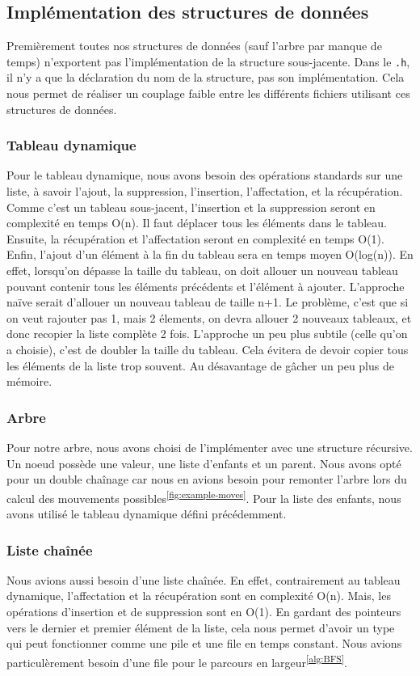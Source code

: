\subsection{Implémentation des structures de données}
Premièrement toutes nos structures de données (sauf l'arbre par manque de temps)
n'exportent pas l'implémentation de la structure sous-jacente. Dans le \verb|.h|, il n'y a que la déclaration
du nom de la structure, pas son implémentation. Cela nous permet de réaliser un couplage faible
entre les différents fichiers utilisant ces structures de données.
\subsubsection{Tableau dynamique}
Pour le tableau dynamique, nous avons besoin des opérations standards 
sur une liste, à savoir l'ajout, la suppression, l'insertion, l'affectation, et la récupération.
Comme c'est un tableau sous-jacent, l'insertion et la suppression seront en complexité en temps O(n).
Il faut déplacer tous les éléments dans le tableau.
Ensuite, la récupération et l'affectation seront en complexité en temps O(1).
Enfin, l'ajout d'un élément à la fin du tableau sera en temps moyen O(log(n)).
En effet, lorsqu'on dépasse la taille du tableau, on doit allouer un nouveau tableau
pouvant contenir tous les éléments précédents et l'élément à ajouter.
L'approche naïve serait d'allouer un nouveau tableau de taille n+1. Le problème,
c'est que si on veut rajouter pas 1, mais 2 élements, on devra allouer 2 nouveaux tableaux, et donc recopier la liste complète 2 fois.
L'approche un peu plus subtile (celle qu'on a choisie), c'est de doubler la taille du tableau.
Cela évitera de devoir copier tous les éléments de la liste trop souvent. Au désavantage de gâcher un peu plus de mémoire.
\subsubsection{Arbre}
Pour notre arbre, nous avons choisi de l'implémenter avec une structure récursive.
Un noeud possède une valeur, une liste d'enfants et un parent.
Nous avons opté pour un double chaînage car nous en avions besoin pour remonter l'arbre
lors du calcul des mouvements possibles\textsuperscript{\ref{fig:example-moves}}.
Pour la liste des enfants, nous avons utilisé le tableau dynamique défini précédemment.
\subsubsection{Liste chaînée}
Nous avions aussi besoin d'une liste chaînée.
En effet, contrairement au tableau dynamique, l'affectation et la récupération sont en complexité O(n).
Mais, les opérations d'insertion et de suppression sont en O(1). En gardant
des pointeurs vers le dernier et premier élément de la liste, cela nous permet d'avoir un type
qui peut fonctionner comme une pile et une file en temps constant. Nous avions
particulèrement besoin d'une file pour le parcours en largeur\textsuperscript{\ref{alg:BFS}}.
